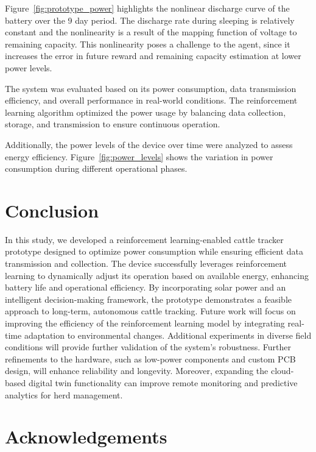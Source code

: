 \documentclass[10pt]{cai}
\begin{document}
Figure~\ref{fig:prototype_power} highlights the nonlinear discharge curve of the battery over the 9 day period. 
The discharge rate during sleeping is relatively constant and the nonlinearity is a result of the mapping function of voltage to remaining capacity.
This nonlinearity poses a challenge to the agent, since it increases the error in future reward and remaining capacity estimation at lower power levels.



The system was evaluated based on its power consumption, data transmission efficiency, and overall performance in real-world conditions. 
The reinforcement learning algorithm optimized the power usage by balancing data collection, storage, and transmission to ensure continuous operation.

Additionally, the power levels of the device over time were analyzed to assess energy efficiency. Figure~\ref{fig:power_levels} shows the variation in power consumption during different operational phases.



\section{Conclusion}
In this study, we developed a reinforcement learning-enabled cattle tracker prototype designed to optimize power consumption while ensuring efficient data transmission and collection. The device successfully leverages reinforcement learning to dynamically adjust its operation based on available energy, enhancing battery life and operational efficiency. By incorporating solar power and an intelligent decision-making framework, the prototype demonstrates a feasible approach to long-term, autonomous cattle tracking.
Future work will focus on improving the efficiency of the reinforcement learning model by integrating real-time adaptation to environmental changes. Additional experiments in diverse field conditions will provide further validation of the system's robustness. Further refinements to the hardware, such as low-power components and custom PCB design, will enhance reliability and longevity. Moreover, expanding the cloud-based digital twin functionality can improve remote monitoring and predictive analytics for herd management.

\section*{Acknowledgements}

\printbibliography[heading=subbibintoc]
\end{document}
